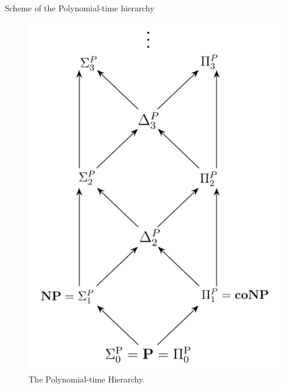         \begin{frame}{Scheme of the Polynomial-time hierarchy}            
            \begin{figure}
                \centering
                \includegraphics[scale=.4]{images/PH.png}
                \caption{The Polynomial-time Hierarchy.}
                \label{fig:The Polynomial-time Hierarchy}
            \end{figure}
        \end{frame}

